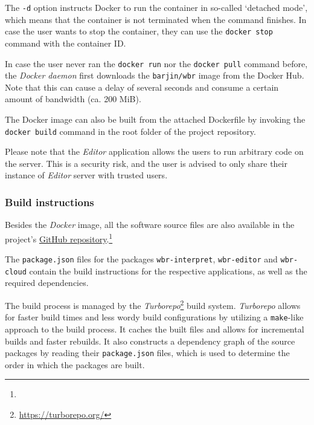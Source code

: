The \texttt{-d} option instructs Docker to run the container in so-called `detached mode', which means that the container is not terminated when the command finishes. 
In case the user wants to stop the container, they can use the \texttt{docker stop} command with the container ID.

In case the user never ran the \texttt{docker run} nor the \texttt{docker pull} command before, the \textit{Docker daemon} first downloads the \texttt{barjin/wbr} image from the Docker Hub.
Note that this can cause a delay of several seconds and consume a certain amount of bandwidth (ca. 200 MiB).

The Docker image can also be built from the attached Dockerfile by invoking the \texttt{docker build} command in the root folder of the project repository.

Please note that the \textit{Editor} application allows the users to run arbitrary code on the server.
This is a security risk, and the user is advised to only share their instance of \textit{Editor} server with trusted users.

\subsubsection{Build instructions}
Besides the \textit{Docker} image, all the software source files are also available in the project's \href{https://github.com/barjin/wbr/}{GitHub repository}.\footnote{\githubInfo}

The \texttt{package.json} files for the packages \texttt{wbr-interpret}, \texttt{wbr-editor} and \texttt{wbr-cloud} contain the build instructions for the respective applications,
as well as the required dependencies.


The build process is managed by the \textit{Turborepo}\footnote{\url{https://turborepo.org/}} build system. 
\textit{Turborepo} allows for faster build times and less wordy build configurations by utilizing a \texttt{make}-like approach 
to the build process. It caches the built files and allows for incremental builds and faster rebuilds. 
It also constructs a dependency graph of the source packages by reading their \texttt{package.json} files, which is used to determine the order in which the packages are built.

